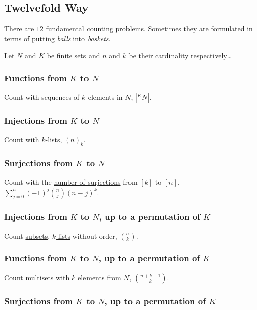 \subsection{Twelvefold Way}\label{twelvefoldway}

There are $12$ fundamental counting problems. Sometimes they are formulated in terms of putting \emph{balls} into \emph{baskets}.\newline

Let $N$ and $K$ be finite sets and $n$ and $k$ be their cardinality respectively\dots

\subsubsection{Functions from $K$ to $N$}

Count with sequences of $k$ elements in $N$, $|^KN|$.

\subsubsection{Injections from $K$ to $N$}

Count with \hyperref[k-list]{$k$-lists}, $(n)_k$.

\subsubsection{Surjections from $K$ to $N$}

Count with the \hyperref[secondstirlingnumbers]{number of surjections} from $[k]$ to $[n]$, $\sum^n_{j=0} (-1)^j {n \choose j} (n-j)^k$.

\subsubsection{Injections from $K$ to $N$, up to a permutation of $K$}

Count \hyperref[countingsubsets]{subsets}, \hyperref[k-list]{$k$-lists} without order, ${n \choose k}$.

\subsubsection{Functions from $K$ to $N$, up to a permutation of $K$}

Count \hyperref[multisets]{multisets} with $k$ elements from $N$, ${n + k - 1 \choose k}$.

\subsubsection{Surjections from $K$ to $N$, up to a permutation of $K$}

